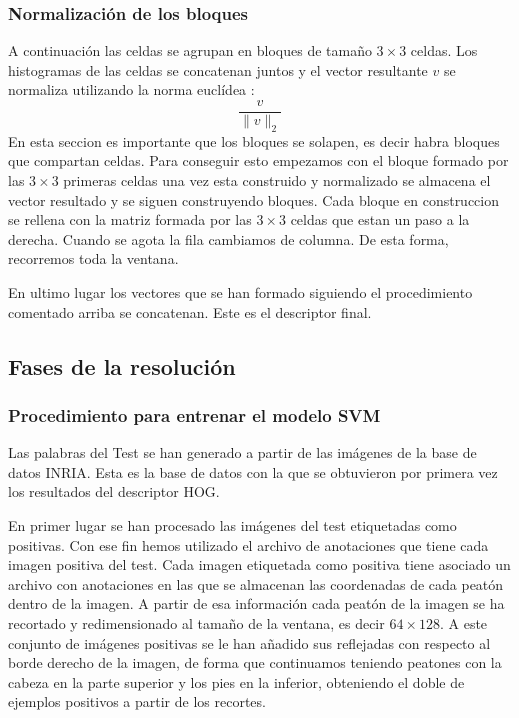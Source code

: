 \documentclass[a4paper,12pt]{article}
\begin{document}
\subsubsection{Normalización de los bloques}

A continuación las celdas se agrupan en bloques de tamaño
$3\times 3$ celdas. Los histogramas de las celdas se concatenan
juntos y el vector resultante $v$ se normaliza utilizando la
norma euclídea :
\[
  \frac{v}{\|v\|_2}
\]
En esta seccion es importante que los bloques se solapen, es
decir habra bloques que compartan celdas. Para conseguir esto
empezamos con el bloque formado por las $3\times 3$ primeras
celdas una vez esta construido y normalizado se almacena el
vector resultado y se siguen construyendo bloques. Cada bloque
en construccion se rellena con la matriz formada por las
$3\times 3$ celdas que estan un paso a la derecha. Cuando
se agota la fila cambiamos de columna. De esta forma,
recorremos toda la ventana.

En ultimo lugar los vectores que se han formado siguiendo el
procedimiento comentado arriba se concatenan. Este es el
descriptor final.

\subsection{Fases de la resolución}


\subsubsection{Procedimiento para entrenar el modelo SVM}

Las palabras del Test se han generado a partir de las imágenes de
la base de datos INRIA. Esta es la base de datos con la que se
obtuvieron por primera vez los resultados del descriptor HOG.

En primer lugar se han procesado las imágenes del test etiquetadas
como positivas. Con ese fin hemos utilizado el archivo de anotaciones
que tiene cada imagen positiva del test. Cada imagen etiquetada como
positiva tiene asociado un archivo con anotaciones en las que se almacenan
las coordenadas de cada peatón dentro de la imagen. A partir de esa
información cada peatón de la imagen se ha recortado y redimensionado
al tamaño de la ventana, es decir $64\times 128$. A este conjunto de imágenes positivas se le han añadido sus reflejadas con respecto al borde derecho de la imagen, de forma que continuamos teniendo peatones con la cabeza en la parte superior y los pies en la inferior, obteniendo el doble de ejemplos positivos a partir de los recortes.
\end{document}
